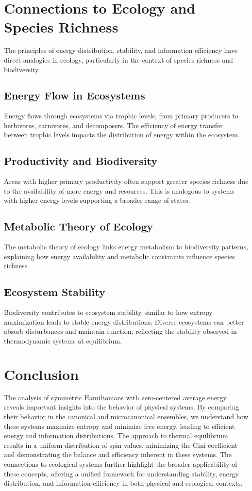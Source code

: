 \documentclass{article}
\begin{document}
\section{Connections to Ecology and Species Richness}

The principles of energy distribution, stability, and information efficiency have direct analogies in ecology, particularly in the context of species richness and biodiversity.

\subsection{Energy Flow in Ecosystems}
Energy flows through ecosystems via trophic levels, from primary producers to herbivores, carnivores, and decomposers. The efficiency of energy transfer between trophic levels impacts the distribution of energy within the ecosystem.

\subsection{Productivity and Biodiversity}
Areas with higher primary productivity often support greater species richness due to the availability of more energy and resources. This is analogous to systems with higher energy levels supporting a broader range of states.

\subsection{Metabolic Theory of Ecology}
The metabolic theory of ecology links energy metabolism to biodiversity patterns, explaining how energy availability and metabolic constraints influence species richness.

\subsection{Ecosystem Stability}
Biodiversity contributes to ecosystem stability, similar to how entropy maximization leads to stable energy distributions. Diverse ecosystems can better absorb disturbances and maintain function, reflecting the stability observed in thermodynamic systems at equilibrium.

\section{Conclusion}

The analysis of symmetric Hamiltonians with zero-centered average energy reveals important insights into the behavior of physical systems. By comparing their behavior in the canonical and microcanonical ensembles, we understand how these systems maximize entropy and minimize free energy, leading to efficient energy and information distributions. The approach to thermal equilibrium results in a uniform distribution of spin values, minimizing the Gini coefficient and demonstrating the balance and efficiency inherent in these systems. The connections to ecological systems further highlight the broader applicability of these concepts, offering a unified framework for understanding stability, energy distribution, and information efficiency in both physical and ecological contexts.



\nocite{*}
\end{document}
